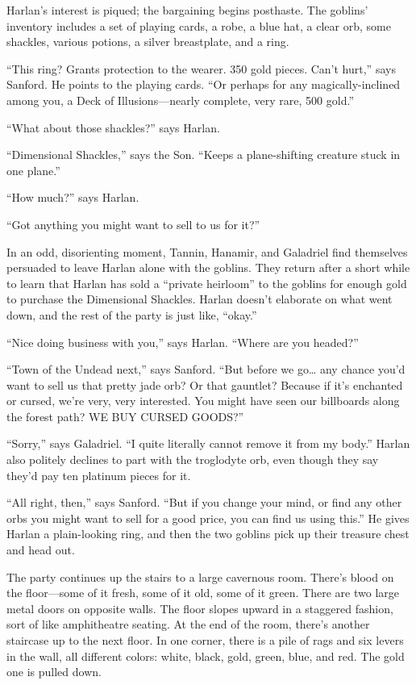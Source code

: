 \documentclass[smalldemyvopaper,11pt,twoside,onecolumn,openright,extrafontsizes]{memoir}
\begin{document}
Harlan's interest is piqued; the bargaining begins posthaste. The
goblins' inventory includes a set of playing cards, a robe, a blue hat,
a clear orb, some shackles, various potions, a silver breastplate, and a
ring.

``This ring? Grants protection to the wearer. 350 gold pieces. Can't
hurt,'' says Sanford. He points to the playing cards. ``Or perhaps for
any magically-inclined among you, a Deck of Illusions---nearly complete,
very rare, 500 gold.''

``What about those shackles?'' says Harlan.

``Dimensional Shackles,'' says the Son. ``Keeps a plane-shifting
creature stuck in one plane.''

``How much?'' says Harlan.

``Got anything you might want to sell to us for it?''

In an odd, disorienting moment, Tannin, Hanamir, and Galadriel find
themselves persuaded to leave Harlan alone with the goblins. They return
after a short while to learn that Harlan has sold a ``private heirloom''
to the goblins for enough gold to purchase the Dimensional Shackles.
Harlan doesn't elaborate on what went down, and the rest of the party is
just like, ``okay.''

``Nice doing business with you,'' says Harlan. ``Where are you headed?''

``Town of the Undead next,'' says Sanford. ``But before we go\ldots{}
any chance you'd want to sell us that pretty jade orb? Or that gauntlet?
Because if it's enchanted or cursed, we're very, very interested. You
might have seen our billboards along the forest path? WE BUY CURSED
GOODS?''

``Sorry,'' says Galadriel. ``I quite literally cannot remove it from my
body.'' Harlan also politely declines to part with the troglodyte orb,
even though they say they'd pay ten platinum pieces for it.

``All right, then,'' says Sanford. ``But if you change your mind, or
find any other orbs you might want to sell for a good price, you can
find us using this.'' He gives Harlan a plain-looking ring, and then the
two goblins pick up their treasure chest and head out.

The party continues up the stairs to a large cavernous room. There's
blood on the floor---some of it fresh, some of it old, some of it green.
There are two large metal doors on opposite walls. The floor slopes
upward in a staggered fashion, sort of like amphitheatre seating. At the
end of the room, there's another staircase up to the next floor. In one
corner, there is a pile of rags and six levers in the wall, all
different colors: white, black, gold, green, blue, and red. The gold one
is pulled down.
\end{document}
